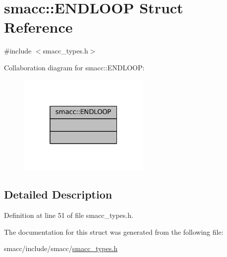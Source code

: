 \hypertarget{structsmacc_1_1ENDLOOP}{}\section{smacc\+:\+:E\+N\+D\+L\+O\+OP Struct Reference}
\label{structsmacc_1_1ENDLOOP}


{\ttfamily \#include $<$smacc\+\_\+types.\+h$>$}



Collaboration diagram for smacc\+:\+:E\+N\+D\+L\+O\+OP\+:
\nopagebreak
\begin{figure}[H]
\begin{center}
\leavevmode
\includegraphics[width=181pt]{structsmacc_1_1ENDLOOP__coll__graph}
\end{center}
\end{figure}


\subsection{Detailed Description}


Definition at line 51 of file smacc\+\_\+types.\+h.



The documentation for this struct was generated from the following file\+:\begin{DoxyCompactItemize}
\item 
smacc/include/smacc/\hyperlink{smacc__types_8h}{smacc\+\_\+types.\+h}\end{DoxyCompactItemize}
